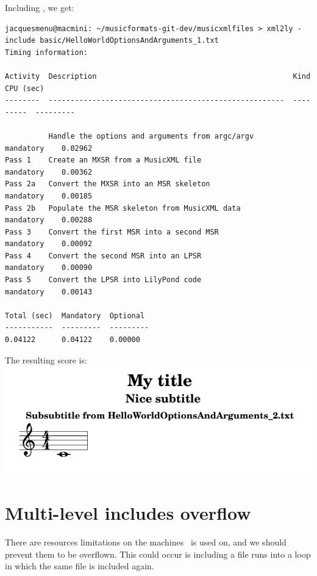 Including , we get:
\begin{lstlisting}[language=Terminal]
jacquesmenu@macmini: ~/musicformats-git-dev/musicxmlfiles > xml2ly -include basic/HelloWorldOptionsAndArguments_1.txt
Timing information:

Activity  Description                                             Kind       CPU (sec)
--------  ------------------------------------------------------  ---------  ---------

          Handle the options and arguments from argc/argv         mandatory    0.02962
Pass 1    Create an MXSR from a MusicXML file                  mandatory    0.00362
Pass 2a   Convert the MXSR into an MSR skeleton                    mandatory    0.00185
Pass 2b   Populate the MSR skeleton from MusicXML data            mandatory    0.00288
Pass 3    Convert the first MSR into a second MSR                 mandatory    0.00092
Pass 4    Convert the second MSR into an LPSR                     mandatory    0.00090
Pass 5    Convert the LPSR into LilyPond code                 mandatory    0.00143

Total (sec)  Mandatory  Optional
-----------  ---------  ---------
0.04122      0.04122    0.00000
\end{lstlisting}

The resulting score is:\\
\includegraphics[scale=0.7]{../mfgraphics/mfgraphicsHelloWorldWithMultiLevelInclude.png}


\section{Multi-level includes overflow}

There are resources limitations on the machines \mf\ is used on, and we should prevent them to be overflown. This could occur is including a file runs into a loop in which the same file is included again.

